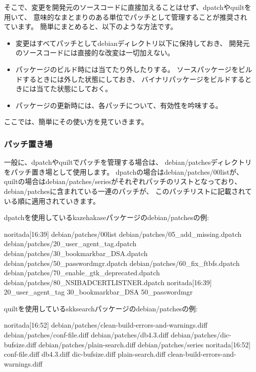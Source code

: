 \documentclass[mingoth,a4paper]{jsarticle}
\begin{document}
そこで、変更を開発元のソースコードに直接加えることはせず、dpatchやquiltを用いて、
意味的なまとまりのある単位でパッチとして管理することが推奨されています。
簡単にまとめると、以下のような方法です。

\begin{itemize}
 \item 変更はすべてパッチとしてdebianディレクトリ以下に保持しておき、
  開発元のソースコードには直接的な改変は一切加えない。
 \item パッケージのビルド時には当てたり外したりする。
  ソースパッケージをビルドするときには外した状態にしておき、
  バイナリパッケージをビルドするときには当てた状態にしておく。
 \item パッケージの更新時には、各パッチについて、有効性を吟味する。
\end{itemize}

ここでは、簡単にその使い方を見ていきます。

\subsubsection{パッチ置き場}

一般に、dpatchやquiltでパッチを管理する場合は、
debian/patchesディレクトリをパッチ置き場として使用します。
dpatchの場合はdebian/patches/00listが、
quiltの場合はdebian/patches/seriesがそれぞれパッチのリストとなっており、
debian/patchesに含まれている一連のパッチが、
このパッチリストに記載されている順に適用されていきます。

dpatchを使用しているkazehakaseパッケージのdebian/patchesの例:

\begin{commandline}
noritada[16:39]%
debian/patches/00list
debian/patches/05_add_missing.dpatch
debian/patches/20_user_agent_tag.dpatch
debian/patches/30_bookmarkbar_DSA.dpatch
debian/patches/50_passwordmgr.dpatch
debian/patches/60_fix_ftbfs.dpatch
debian/patches/70_enable_gtk_deprecated.dpatch
debian/patches/80_NSIBADCERTLISTNER.dpatch
noritada[16:39]%
20_user_agent_tag
30_bookmarkbar_DSA
50_passwordmgr
\end{commandline}

quiltを使用しているskksearchパッケージのdebian/patchesの例:

\begin{commandline}
noritada[16:52]%
debian/patches/clean-build-errors-and-warnings.diff
debian/patches/conf-file.diff
debian/patches/db4.3.diff
debian/patches/dic-bufsize.diff
debian/patches/plain-search.diff
debian/patches/series
noritada[16:52]%
conf-file.diff
db4.3.diff
dic-bufsize.diff
plain-search.diff
clean-build-errors-and-warnings.diff
\end{commandline}
\end{document}
